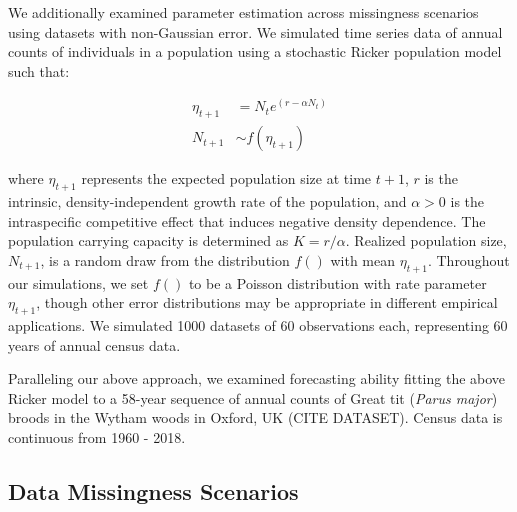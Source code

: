 \documentclass{article}
\begin{document}
We additionally examined parameter estimation across missingness scenarios using datasets with non-Gaussian error. We simulated time series data of annual counts of individuals in a population using a stochastic Ricker population model \citep{ricker1954stock} such that:


\begin{subequations}
\begin{align} \label{eq:ricker2}
    \eta_{t+1} &= N_t e^{(r - \alpha N_t)}\\
    N_{t+1} &\sim f(\eta_{t+1})
\end{align}
\end{subequations}

\noindent where \(\eta_{t+1}\) represents the expected population size at time \(t+1\), \(r\) is the intrinsic, density-independent growth rate of the population, and $\alpha > 0$ is the intraspecific competitive effect that induces negative density dependence. The population carrying capacity is determined as $K= r/\alpha$. Realized population size, $N_{t+1}$, is a random draw from the distribution $f()$ with mean $\eta_{t+1}$. Throughout our simulations, we set $f()$ to be a Poisson distribution with rate parameter $\eta_{t+1}$, though other error distributions may be appropriate in different empirical applications. We simulated 1000 datasets of 60 observations each, representing 60 years of annual census data. 

Paralleling our above approach, we examined forecasting ability fitting the above Ricker model to a 58-year sequence of annual counts of Great tit (\textit{Parus major}) broods in the Wytham woods in Oxford, UK (CITE DATASET). Census data is continuous from 1960 - 2018. 

\subsection*{Data Missingness Scenarios}
\end{document}
